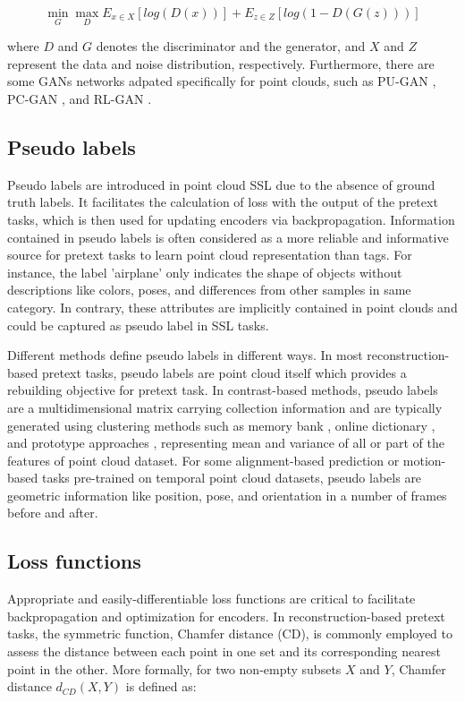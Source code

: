 \documentclass[a4paper,fleqn]{cas-dc}
\begin{document}
\begin{equation}
    \mathop{min}\limits_{G}\mathop{max}\limits_{D}E_{x\in X}[log(D(x))]+E_{z\in Z}[log(1-D(G(z)))]
\end{equation}

where $D$ and $G$ denotes the discriminator and the generator, and $X$ and $Z$ represent the data and noise distribution, respectively. Furthermore, there are some GANs networks adpated specifically for point clouds, such as PU-GAN \citep{li2019pu}, PC-GAN \citep{li2018point}, and RL-GAN \citep{sarmad2019rl}.

\subsection{Pseudo labels}
Pseudo labels are introduced in point cloud SSL due to the absence of ground truth labels. It facilitates the calculation of loss with the output of the pretext tasks, which is then used for updating encoders via backpropagation. Information contained in pseudo labels is often considered as a more reliable and informative source for pretext tasks to learn point cloud representation than tags. For instance, the label 'airplane' only indicates the shape of objects without descriptions like colors, poses, and differences from other samples in same category. In contrary, these attributes are implicitly contained in point clouds and could be captured as pseudo label in SSL tasks.

Different methods define pseudo labels in different ways. In most reconstruction-based pretext tasks, pseudo labels are point cloud itself which provides a rebuilding objective for pretext task. In contrast-based methods, pseudo labels are a multidimensional matrix carrying collection information and are typically generated using clustering methods such as memory bank \citep{wu2018unsupervised}, online dictionary \citep{he2020momentum}, and prototype approaches \citep{caron2020unsupervised}, representing mean and variance of all or part of the features of point cloud dataset. For some alignment-based prediction or motion-based tasks pre-trained on temporal point cloud datasets, pseudo labels are geometric information like position, pose, and orientation in a number of frames before and after.

\subsection{Loss functions}
Appropriate and easily-differentiable loss functions are critical to facilitate backpropagation and optimization for encoders. In reconstruction-based pretext tasks, the symmetric function, Chamfer distance (CD), is commonly employed to assess the distance between each point in one set and its corresponding nearest point in the other. More formally, for two non-empty subsets $X$ and $Y$, Chamfer distance $d_{CD}(X,Y)$ is defined as:
\end{document}
